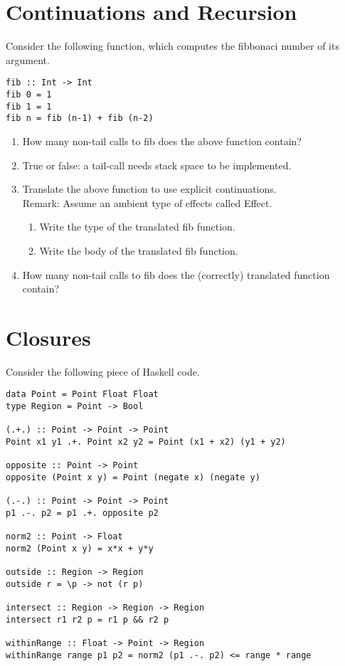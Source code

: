 \documentclass{article}
\begin{document}
\section{Continuations and Recursion}

Consider the following function, which computes the fibbonaci number
of its argument.
\begin{verbatim}
fib :: Int -> Int
fib 0 = 1
fib 1 = 1
fib n = fib (n-1) + fib (n-2)
\end{verbatim}

\begin{enumerate}
\item How many non-tail calls to fib does the above function contain?
\item True or false: a tail-call needs stack space to be
  implemented. 
\item Translate the above function to use explicit continuations.
  \\ Remark: Assume an ambient type of effects called Effect.
  \begin{enumerate}
  \item  Write the type of the translated fib function. 
  \item  Write the body of the translated fib function. 
  \end{enumerate}
\item How many non-tail calls to fib does the (correctly) translated function
  contain? 
\end{enumerate}

\section{Closures}

Consider the following piece of Haskell code.
\begin{verbatim}
data Point = Point Float Float
type Region = Point -> Bool

(.+.) :: Point -> Point -> Point
Point x1 y1 .+. Point x2 y2 = Point (x1 + x2) (y1 + y2)

opposite :: Point -> Point
opposite (Point x y) = Point (negate x) (negate y)

(.-.) :: Point -> Point -> Point
p1 .-. p2 = p1 .+. opposite p2

norm2 :: Point -> Float
norm2 (Point x y) = x*x + y*y

outside :: Region -> Region
outside r = \p -> not (r p)

intersect :: Region -> Region -> Region
intersect r1 r2 p = r1 p && r2 p

withinRange :: Float -> Point -> Region
withinRange range p1 p2 = norm2 (p1 .-. p2) <= range * range
\end{verbatim}
\end{document}
